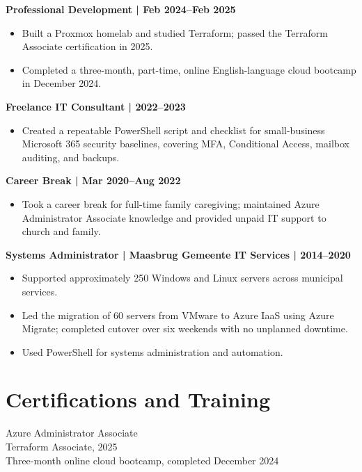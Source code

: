 \documentclass[11pt,a4paper]{article}
\begin{document}
\textbf{Professional Development | Feb 2024–Feb 2025}
\begin{itemize}
\item Built a Proxmox homelab and studied Terraform; passed the Terraform Associate certification in 2025.
\item Completed a three-month, part-time, online English-language cloud bootcamp in December 2024.
\end{itemize}

\textbf{Freelance IT Consultant | 2022–2023}
\begin{itemize}
\item Created a repeatable PowerShell script and checklist for small-business Microsoft 365 security baselines, covering MFA, Conditional Access, mailbox auditing, and backups.
\end{itemize}

\textbf{Career Break | Mar 2020–Aug 2022}
\begin{itemize}
\item Took a career break for full-time family caregiving; maintained Azure Administrator Associate knowledge and provided unpaid IT support to church and family.
\end{itemize}

\textbf{Systems Administrator | Maasbrug Gemeente IT Services | 2014–2020}
\begin{itemize}
\item Supported approximately 250 Windows and Linux servers across municipal services.
\item Led the migration of 60 servers from VMware to Azure IaaS using Azure Migrate; completed cutover over six weekends with no unplanned downtime.
\item Used PowerShell for systems administration and automation.
\end{itemize}

\section*{Certifications and Training}
Azure Administrator Associate\\
Terraform Associate, 2025\\
Three-month online cloud bootcamp, completed December 2024
\end{document}
